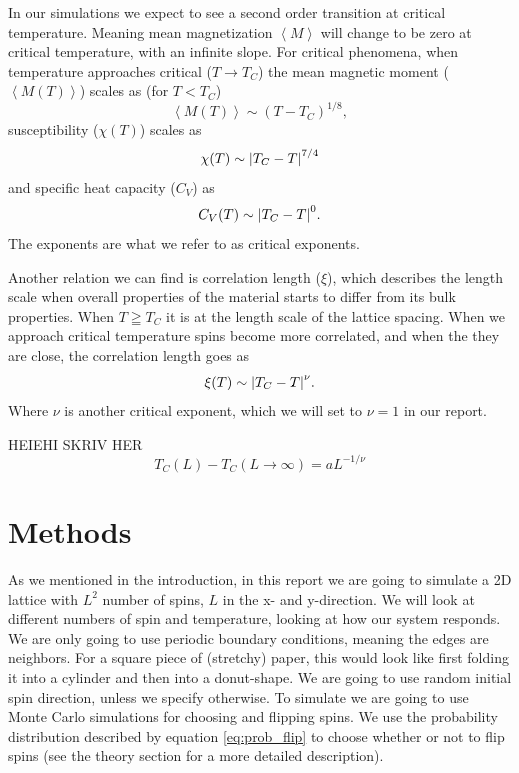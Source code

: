 \documentclass[reprint, english,notitlepage,nofootinbib]{revtex4-1}  %
\begin{document}
In our simulations we expect to see a second order transition at critical temperature. Meaning mean magnetization $\left<M\right>$ will change to be zero at critical temperature, with an infinite slope. For critical phenomena, when temperature approaches critical ($T\rightarrow T_C$) the mean magnetic moment ($\left<M(T)\right>$) scales as (for $T<T_C$)
\begin{equation}
	\label{eq:critical_M}
 	\left<M(T)\right> \sim \left(T - T_C\right)^{1/8},
\end{equation}
susceptibility ($\chi(T)$) scales as
\begin{equation}
	\label{eq:critical_chi}
	\chi(T) \sim \abs{T_C - T}^{7/4}
\end{equation}
and specific heat capacity ($C_V$) as
\begin{equation}
	\label{eq:critical_Cv}
	C_V(T) \sim \abs{T_C - T}^0.
\end{equation}
The exponents are what we refer to as critical exponents.

Another relation we can find is correlation length ($\xi$), which describes the length scale when overall properties of the material starts to differ from its bulk properties. When $T\geqq T_C$ it is at the length scale of the lattice spacing. When we approach critical temperature spins become more correlated, and when the they are close, the correlation length goes as
\begin{equation}
	\label{eq:critical_ksi}
	\xi(T) \sim \abs{T_C - T}^\nu.
\end{equation}
Where $\nu$ is another critical exponent, which we will set to $\nu=1$ in our report.

HEIEHI SKRIV HER
\begin{equation}
	\label{eq:critical_temperature}
	T_C(L) - T_C(L\rightarrow\infty) = aL^{-1/\nu}
\end{equation}

\section{Methods}

As we mentioned in the introduction, in this report we are going to simulate a 2D lattice with $L^2$ number of spins, $L$ in the x- and y-direction. We will look at different numbers of spin and temperature, looking at how our system responds. We are only going to use periodic boundary conditions, meaning the edges are neighbors. For a square piece of (stretchy) paper, this would look like first folding it into a cylinder and then into a donut-shape. We are going to use random initial spin direction, unless we specify otherwise. To simulate we are going to use Monte Carlo simulations for choosing and flipping spins. We use the probability distribution described by equation \eqref{eq:prob_flip} to choose whether or not to flip spins (see the theory section for a more detailed description).
\end{document}
